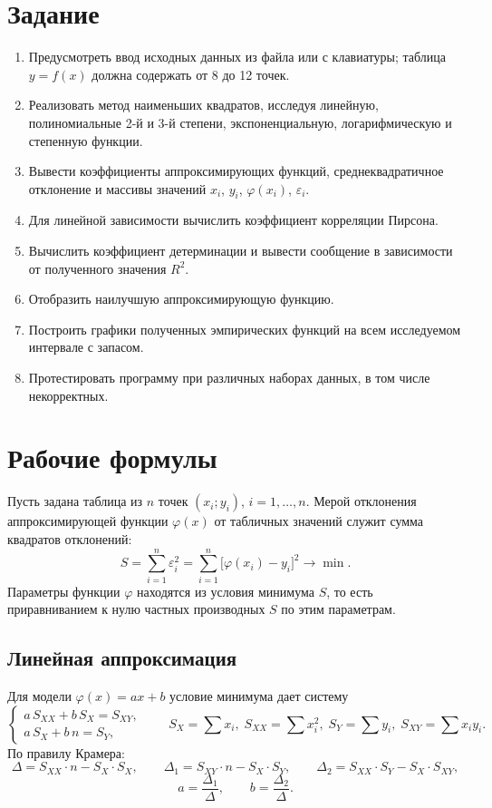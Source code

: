 \documentclass[12pt,a4paper]{article}
\begin{document}
\section*{Задание}
\begin{enumerate}
    \item Предусмотреть ввод исходных данных из файла или с клавиатуры; таблица $y=f(x)$ должна содержать от 8 до 12 точек.
    \item Реализовать метод наименьших квадратов, исследуя линейную, полиномиальные 2-й и 3-й степени, экспоненциальную, логарифмическую и степенную функции.
    \item Вывести коэффициенты аппроксимирующих функций, среднеквадратичное отклонение и массивы значений $x_i$, $y_i$, $\varphi(x_i)$, $\varepsilon_i$.
    \item Для линейной зависимости вычислить коэффициент корреляции Пирсона.
    \item Вычислить коэффициент детерминации и вывести сообщение в зависимости от полученного значения $R^2$.
    \item Отобразить наилучшую аппроксимирующую функцию.
    \item Построить графики полученных эмпирических функций на всем исследуемом интервале с запасом.
    \item Протестировать программу при различных наборах данных, в том числе некорректных.
\end{enumerate}

\section*{Рабочие формулы}
Пусть задана таблица из $n$ точек $(x_i;y_i)$, $i=1,\ldots,n$. Мерой отклонения аппроксимирующей функции $\varphi(x)$ от табличных значений служит сумма квадратов отклонений:
\[
    S=\sum_{i=1}^{n}\varepsilon_i^2=\sum_{i=1}^{n}\bigl[\varphi(x_i)-y_i\bigr]^2 \to \min .
\]
Параметры функции $\varphi$ находятся из условия минимума $S$, то есть приравниванием к нулю частных производных $S$ по этим параметрам.

\subsection*{Линейная аппроксимация}
Для модели $\varphi(x)=ax+b$ условие минимума дает систему
\[
    \begin{cases}
        a\,S_{XX}+b\,S_X=S_{XY},\\
        a\,S_X+b\,n=S_Y,
    \end{cases}
    \qquad
    S_X=\sum x_i,\; S_{XX}=\sum x_i^2,\; S_Y=\sum y_i,\; S_{XY}=\sum x_iy_i .
\]
По правилу Крамера:
\[
    \Delta=S_{XX}\cdot n-S_X\cdot S_X,\qquad
    \Delta_1=S_{XY}\cdot n-S_X\cdot S_Y,\qquad
    \Delta_2=S_{XX}\cdot S_Y-S_X\cdot S_{XY},
\]
\[
    a=\frac{\Delta_1}{\Delta},\qquad b=\frac{\Delta_2}{\Delta}.
\]
\end{document}
